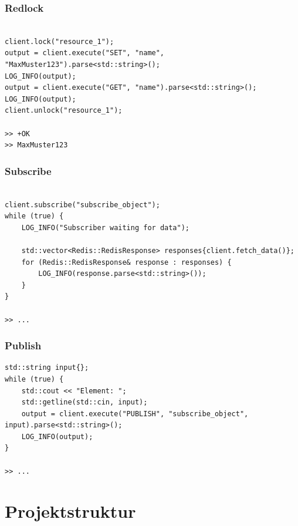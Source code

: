 \documentclass[12pt, letterpaper]{article}
\newenvironment{code}{\captionsetup{type=listing}}{}
\begin{document}
\subsubsection{Redlock}
\begin{code}
\begin{verbatim}

client.lock("resource_1");
output = client.execute("SET", "name", "MaxMuster123").parse<std::string>();
LOG_INFO(output);
output = client.execute("GET", "name").parse<std::string>();
LOG_INFO(output);
client.unlock("resource_1");

>> +OK
>> MaxMuster123
\end{verbatim}  
\end{code}

\subsubsection{Subscribe}
\begin{code}
\begin{verbatim}

client.subscribe("subscribe_object");
while (true) {
    LOG_INFO("Subscriber waiting for data");
        
    std::vector<Redis::RedisResponse> responses{client.fetch_data()};
    for (Redis::RedisResponse& response : responses) {
        LOG_INFO(response.parse<std::string>());
    }
}

>> ...
\end{verbatim}  
\end{code}

\subsubsection{Publish}
\begin{code}
\begin{verbatim}
std::string input{};
while (true) {
    std::cout << "Element: ";
    std::getline(std::cin, input);
    output = client.execute("PUBLISH", "subscribe_object", input).parse<std::string>();
    LOG_INFO(output);
}

>> ...
\end{verbatim}  
\end{code}

\newpage

\section{Projektstruktur}
\hfill

\newpage


\end{document}
